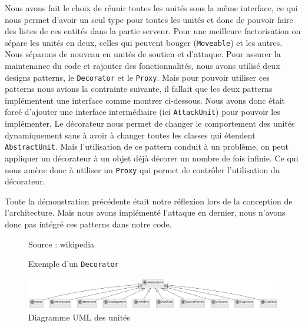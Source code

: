 Nous avons fait le choix de réunir toutes les unités sous la même interface, ce qui nous permet d'avoir un seul type pour toutes les unités et donc de pouvoir faire des listes de ces entités dans la partie serveur.
Pour une meilleure factorisation on sépare les unités en deux, celles qui peuvent bouger (\lstinline{Moveable}) et les autres. Nous séparons de nouveau en unités de soutien et d'attaque. Pour assurer la maintenance du code et rajouter des fonctionnalités, nous avons utilisé deux designs patterns, le \lstinline{Decorator} et le \lstinline{Proxy}. Mais pour pouvoir utiliser ces patterns nous avions la contrainte suivante, il fallait que les deux patterns implémentent une interface comme montrer ci-dessous. Nous avons donc était forcé d'ajouter une interface intermédiaire (ici \lstinline{AttackUnit}) pour pouvoir les implémenter. Le décorateur nous permet de changer le comportement des unités dynamiquement sans à avoir à changer toutes les classes qui étendent \lstinline{AbstractUnit}. Mais l'utilisation de ce pattern conduit à un problème, on peut appliquer un décorateur à un objet déjà décorer un nombre de fois infinie. Ce qui nous amène donc à utiliser un \lstinline{Proxy} qui permet de contrôler l'utilisation du décorateur.

Toute la démonstration précédente était notre réflexion lors de la conception de l'architecture. Mais nous avons implémenté l'attaque en dernier, nous n'avons donc pas intégré ces patterns dans notre code.

\begin{figure}[H]
    \centering
    \def\stackalignment{r}
    {\scriptsize%
        Source : wikipedia}
    \caption{Exemple d'un {\tt Decorator}}
    \label{fig:UML_Decorator_Pattern_Exmple}
\end{figure}


\begin{figure}[H]
    \centering
    \includegraphics[scale=0.3]{data/uml_abstract_unit.png}
    \caption{Diagramme UML des unités}
    \label{fig:uml_abstract_unit}
\end{figure}

